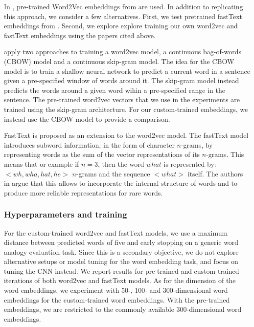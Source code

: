 \documentclass[conference]{IEEEtran}
\begin{document}
In \cite{kim-2014-convolutional}, pre-trained Word2Vec embeddings from \cite{mikolov2013distributed, mikolov2013efficient} are used. In addition to replicating this approach, we consider a few alternatives. First, we test pretrained fastText embeddings from \cite{bojanowski2016enriching, joulin2016bag}. Second, we explore explore training our own word2vec and fastText embeddings using the papers cited above.

 \cite{mikolov2013efficient} apply two approaches to training a word2vec model, a continuous bag-of-words (CBOW) model and a continuous skip-gram model. The idea for the CBOW model  is to train a shallow neural network to predict a current word in a sentence given a pre-specified window of words around it. The skip-gram model instead predicts the words around a given word wihin a pre-specified range in the sentence. The pre-trained word2vec vectors that we use in the experiments are trained using the skip-gram architecture. For our custom-trained embeddings, we instead use the CBOW model to provide a comparison.

FastText \cite{bojanowski2016enriching} is proposed as an extension to the word2vec model. The fastText model introduces subword information, in the form of character $n$-grams, by representing words as the sum of the vector representations of its $n$-grams. This means that or example if $n = 3$, then the word $what$ is represented by: $<wh, wha, hat, he>$ $n$-grams and the sequence $<what>$ itself. The authors in \cite{bojanowski2016enriching} argue that this allows to incorporate the internal structure of words and to produce more reliable representations for rare words.


\subsubsection{Hyperparameters and training}
For the custom-trained word2vec and fastText models, we use a maximum distance between predicted words of five and early stopping on a generic word analogy evaluation task. Since this is a secondary objective, we do not explore alternative setups or model tuning for the word embedding task, and focus on tuning the CNN instead. We report results for pre-trained and custom-trained iterations of both word2vec and fastText models. As for the dimension of the word embeddings, we experiment with 50-, 100- and 300-dimensional word embeddings for the custom-trained word embeddings. With the pre-trained embeddings, we are restricted to the commonly available 300-dimensional word embeddings. 
\end{document}
